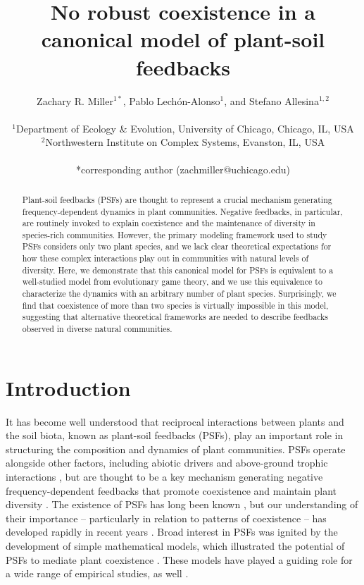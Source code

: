 \documentclass[11pt]{article}
\title{No robust coexistence in a canonical model of plant-soil feedbacks}
\date{}
\author{Zachary R. Miller$^{1*}$, Pablo Lech\'{o}n-Alonso$^{1}$, and Stefano Allesina$^{1,2}$\\
	\\
	\normalsize{$^{1}$Department of Ecology \& Evolution, University of Chicago, Chicago, IL, USA}\\
	\normalsize{$^{2}$Northwestern Institute on Complex Systems, Evanston, IL, USA}\\
	\\
	\normalsize{*corresponding author (zachmiller@uchicago.edu)}\\
}
\begin{document}
	
\maketitle
{}

\linenumbers

\begin{abstract}
Plant-soil feedbacks (PSFs) are thought to represent a crucial mechanism generating frequency-dependent dynamics in plant communities. Negative feedbacks, in particular, are routinely invoked to explain coexistence and the maintenance of diversity in species-rich communities. However, the primary modeling framework used to study PSFs considers only two plant species, and we lack clear theoretical expectations for how these complex interactions play out in communities with natural levels of diversity. Here, we demonstrate that this canonical model for PSFs is equivalent to a well-studied model from evolutionary game theory, and we use this equivalence to characterize the dynamics with an arbitrary number of plant species. Surprisingly, we find that coexistence of more than two species is virtually impossible in this model, suggesting that alternative theoretical frameworks are needed to describe feedbacks observed in diverse natural communities. 
\end{abstract}

\section{Introduction}

It has become well understood that reciprocal interactions between plants and the soil biota, known as plant-soil feedbacks (PSFs), play an important role in structuring the composition and dynamics of plant communities. PSFs operate alongside other factors, including abiotic drivers \citep{bennett2019mechanisms} and above-ground trophic interactions \citep{van2009empirical}, but are thought to be a key mechanism generating negative frequency-dependent feedbacks that promote coexistence and maintain plant diversity \citep{kulmatiski2008plant,van2013plant,bever2015maintenance}. The existence of PSFs has long been known \citep{van1993plant,bever1994feedback}, but our understanding of their importance -- particularly in relation to patterns of coexistence -- has developed rapidly in recent years \citep{klironomos2002feedback,petermann2008janzen,mangan2010negative}. Broad interest in PSFs was ignited by the development of simple mathematical models, which illustrated the potential of PSFs to mediate plant coexistence \citep{bever1997incorporating,bever2003soil,ke2015incorporating}. These models have played a guiding role for a wide range of empirical studies, as well \citep{kulmatiski2008plant,kulmatiski2011testing,pernilla2010plant}.
\end{document}
